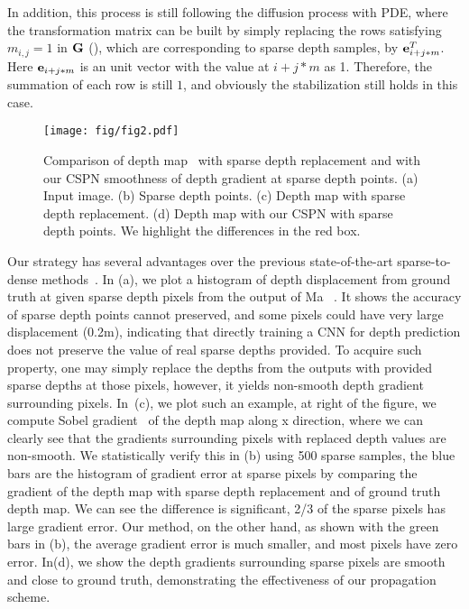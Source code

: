 
In addition, this process is still following the diffusion process with PDE, where the transformation matrix can be built by simply replacing the rows satisfying $m_{i, j} = 1$ in ${\mathbf G}$ (), which are corresponding to sparse depth samples, by ${\mathbf e}_{i + j*m}^T$. Here ${\mathbf e}_{i + j*m}$ is an unit vector with the value at $i + j*m$ as 1.
Therefore, the summation of each row is still $1$, and obviously the stabilization still holds in this case.

\begin{figure}[t]
\centering
\texttt{[image: fig/fig2.pdf]}
\caption{Comparison of depth map~\cite{Ma2017SparseToDense} with sparse depth replacement and with our CSPN \wrt smoothness of depth gradient at sparse depth points. (a) Input image. (b) Sparse depth points. (c) Depth map with sparse depth replacement. (d) Depth map with our CSPN with sparse depth points. We highlight the differences in the red box.}
\label{fig:gradient}
\end{figure}

Our strategy has several advantages over the previous state-of-the-art sparse-to-dense methods~\cite{Ma2017SparseToDense,LiaoHWKYL16}.
In (a), we plot a histogram of depth displacement from ground truth at given sparse depth pixels from the output of Ma \etal~\cite{Ma2017SparseToDense}. It shows the accuracy of sparse depth points cannot preserved, and some pixels could have very large displacement (0.2m), indicating that directly training a CNN for depth prediction does not preserve the value of real sparse depths provided. To acquire such property, 
one may simply replace the depths from the outputs with provided sparse depths at those pixels, however, it yields non-smooth depth gradient \wrt surrounding pixels. 
In~(c), we plot such an example, at right of the figure, we compute Sobel gradient~\cite{sobel2014history} of the depth map along x direction, where we can clearly see that the gradients surrounding pixels with replaced depth values are non-smooth.
We statistically verify this in (b) using 500 sparse samples, the blue bars are the histogram of gradient error  at sparse pixels by comparing the gradient of the depth map with sparse depth replacement and of ground truth depth map. We can see the difference is significant, 2/3 of the sparse pixels has large gradient error.
Our method, on the other hand, as shown with the green bars in (b), the average gradient error is much smaller, and most pixels have zero error. In(d), we show the depth gradients surrounding sparse pixels are smooth and close to ground truth, demonstrating the effectiveness of our propagation scheme. 

